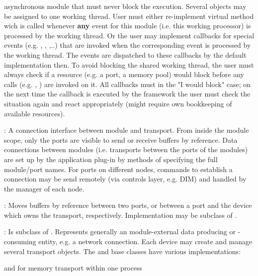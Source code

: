 \begin{description}
   asynchronous module that must never block the execution. Several 
    objects may be assigned to one working thread. User must 
   either re-implement virtual method  wich is called 
   whenever {\bf any} event for this module (i.e. this working processor) 
   is processed by the working thread. Or the user may implement 
   callbacks for special events (e.g. , 
   , ,..) that are invoked when 
   the corresponding event is processed by the working thread. 
   The events are dispatched to these callbacks by the  
   default implementation then. To avoid blocking the shared working thread, 
   the user must always check if a resource (e.g. a port, a memory pool) 
   would block before any calls (e.g. , ) are invoked on it. 
   All callbacks must  in the "I would block" case; on the next 
   time the callback is executed by the framework the user must check the situation 
   again and react appropriately (might require own bookkeeping of available resources). 
\item[\class{dabc::Port}] : A connection interface between module and transport. 
   From inside the module scope, only the ports are visible to send or  receive 
   buffers by reference. Data connections between modules 
   (i.e. transports between the ports of the modules) are set up by 
   the application plug-in by methods of  specifying the full 
   module/port names. For ports on different nodes, commands to establish 
   a connection may be send remotely (via controls layer, e.g. DIM) and 
   handled by the manager of each node.  
\item[\class{dabc::Transport}] : Moves buffers by reference between two 
   ports, or between a port and the device which owns the 
   transport, respectively. Implementation may be subclass of .
\item[\class{dabc::Device}] : Is subclass of . Represents 
   generally an module-external data producing or -consuming entity, e.g. a 
   network connection. 
   Each device may create and manage several transport objects. 
   The  and  base classes have various implementations:
\begin{compactitem}[$\bullet$]
\item {} and  for memory transport within one process

\end{compactitem}
\end{description}
